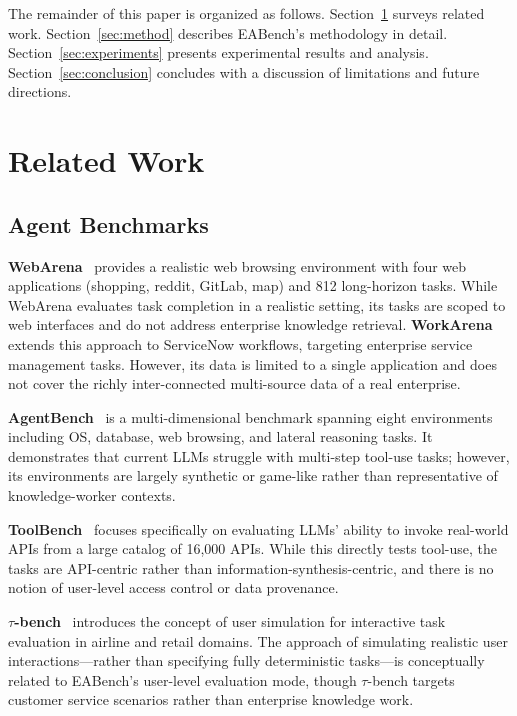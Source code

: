 \documentclass[10pt,twocolumn]{article}
\begin{document}
The remainder of this paper is organized as follows.
Section~\ref{sec:related} surveys related work.
Section~\ref{sec:method} describes EABench's methodology in detail.
Section~\ref{sec:experiments} presents experimental results and analysis.
Section~\ref{sec:conclusion} concludes with a discussion of limitations and
future directions.

\section{Related Work}
\label{sec:related}

\subsection{Agent Benchmarks}

\textbf{WebArena}~\citep{zhou2023webarena} provides a realistic web browsing
environment with four web applications (shopping, reddit, GitLab, map) and 812
long-horizon tasks.  While WebArena evaluates task completion in a realistic
setting, its tasks are scoped to web interfaces and do not address enterprise
knowledge retrieval.  \textbf{WorkArena}~\citep{drouin2024workarena} extends
this approach to ServiceNow workflows, targeting enterprise service management
tasks.  However, its data is limited to a single application and does not cover
the richly inter-connected multi-source data of a real enterprise.

\textbf{AgentBench}~\citep{liu2023agentbench} is a multi-dimensional benchmark
spanning eight environments including OS, database, web browsing, and lateral
reasoning tasks.  It demonstrates that current LLMs struggle with multi-step
tool-use tasks; however, its environments are largely synthetic or game-like
rather than representative of knowledge-worker contexts.

\textbf{ToolBench}~\citep{qin2023toolllm} focuses specifically on evaluating
LLMs' ability to invoke real-world APIs from a large catalog of 16,000 APIs.
While this directly tests tool-use, the tasks are API-centric rather than
information-synthesis-centric, and there is no notion of user-level access
control or data provenance.

\textbf{$\tau$-bench}~\citep{yao2024taubench} introduces the concept of user
simulation for interactive task evaluation in airline and retail domains.  The
approach of simulating realistic user interactions---rather than specifying
fully deterministic tasks---is conceptually related to EABench's user-level
evaluation mode, though $\tau$-bench targets customer service scenarios rather
than enterprise knowledge work.
\end{document}
